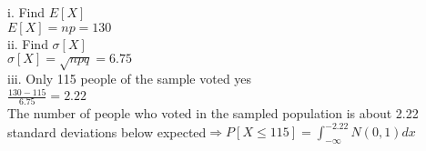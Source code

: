 \documentclass[11pt, oneside]{article}   	%
\begin{document}
i. Find $E[X]$\\
$E[X]=np=130$\\

ii. Find $\sigma[X]$\\
$\sigma[X]=\sqrt{npq}=6.75$\\

iii. Only 115 people of the sample voted yes\\
$\frac{130-115}{6.75}=2.22$\\ The number of people who voted in the sampled population is about 2.22 standard deviations below expected$\Rightarrow P[X\leq 115]=\int_{-\infty}^{-2.22}N(0,1)dx$\\

\end{document}
